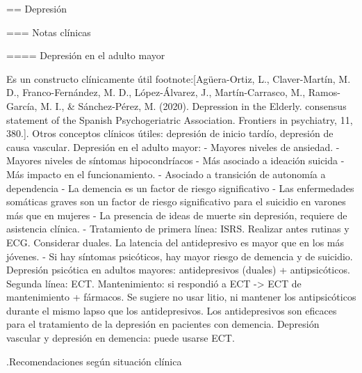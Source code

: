 == Depresión

=== Notas clínicas

==== Depresión en el adulto mayor

Es un constructo clínicamente útil footnote:[Agüera-Ortiz, L., Claver-Martín, M. D., Franco-Fernández, M. D., López-Álvarez, J., Martín-Carrasco, M., Ramos-García, M. I., \& Sánchez-Pérez, M. (2020). Depression in the Elderly. consensus statement of the Spanish Psychogeriatric Association. Frontiers in psychiatry, 11, 380.].
Otros conceptos clínicos útiles: depresión de inicio tardío, depresión de causa vascular.
Depresión en el adulto mayor:
- Mayores niveles de ansiedad.
- Mayores niveles de síntomas hipocondríacos
- Más asociado a ideación suicida
- Más impacto en el funcionamiento.
- Asociado a transición de autonomía a dependencia
- La demencia es un factor de riesgo significativo
- Las enfermedades somáticas graves son un factor de riesgo significativo para el suicidio en varones más que en mujeres
- La presencia de ideas de muerte sin depresión, requiere de asistencia clínica.
- Tratamiento de primera línea: ISRS. Realizar antes rutinas y ECG. Considerar duales. La latencia del antidepresivo es mayor que en los más jóvenes.
- Si hay síntomas psicóticos, hay mayor riesgo de demencia y de suicidio.
Depresión psicótica en adultos mayores: antidepresivos (duales) + antipsicóticos. Segunda línea: ECT. Mantenimiento: si respondió a ECT -> ECT de mantenimiento + fármacos. Se sugiere no usar litio, ni mantener los antipsicóticos durante el mismo lapso que los antidepresivos.
Los antidepresivos son eficaces para el tratamiento de la depresión en pacientes con demencia.
Depresión vascular y depresión en demencia: puede usarse ECT.

.Recomendaciones según situación clínica

